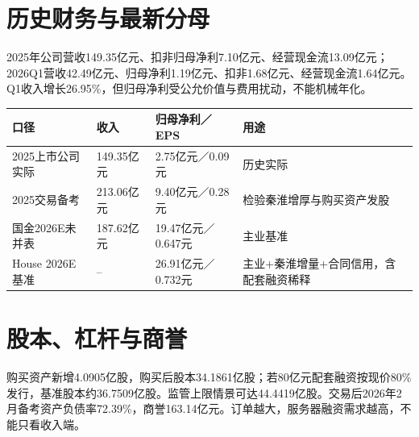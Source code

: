 \section{历史财务与最新分母}

2025年公司营收149.35亿元、扣非归母净利7.10亿元、经营现金流13.09亿元；2026Q1营收42.49亿元、归母净利1.19亿元、扣非1.68亿元、经营现金流1.64亿元。Q1收入增长26.95\%，但归母净利受公允价值与费用扰动，不能机械年化。

\begin{exhibitbox}
\noindent\begin{tabularx}{\textwidth}{L{3.2cm}R{2.0cm}R{2.0cm}X}
\toprule
\textbf{口径} & \textbf{收入} & \textbf{归母净利／EPS} & \textbf{用途} \\
\midrule
2025上市公司实际 & 149.35亿元 & 2.75亿元／0.09元 & 历史实际 \\
2025交易备考 & 213.06亿元 & 9.40亿元／0.28元 & 检验秦淮增厚与购买资产发股 \\
国金2026E未并表 & 187.62亿元 & 19.47亿元／0.647元 & 主业基准 \\
House 2026E基准 & -- & 26.91亿元／0.732元 & 主业+秦淮增量+合同信用，含配套融资稀释 \\
\bottomrule
\end{tabularx}
\end{exhibitbox}

\section{股本、杠杆与商誉}

购买资产新增4.0905亿股，购买后股本34.1861亿股；若80亿元配套融资按现价80\%发行，基准股本约36.7509亿股。监管上限情景可达44.4419亿股。交易后2026年2月备考资产负债率72.39\%，商誉163.14亿元。订单越大，服务器融资需求越高，不能只看收入端。
